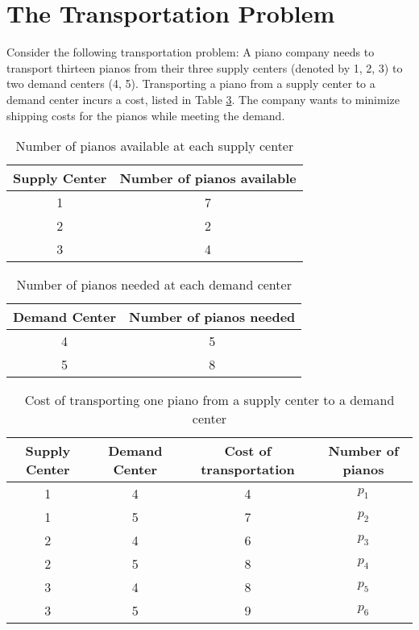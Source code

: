 \section*{The Transportation Problem}

Consider the following transportation problem:
A piano company needs to transport thirteen pianos from their three  supply centers (denoted by 1, 2, 3) to two demand centers (4, 5).
Transporting a piano from a supply center to a demand center incurs a cost, listed in Table \ref{tab:cost}.
The company wants to minimize shipping costs for the pianos while meeting the demand.

\begin{table}[H]
\centering
\begin{tabular}{|c|c|}
Supply Center & Number of pianos available\\
\hline
1 & 7\\
2 & 2\\
3 & 4\\
\end{tabular}

\caption{Number of pianos available at each supply center}
\label{tab:supply}
\end{table}

\begin{table}[H]
\centering
\begin{tabular}{|c|c|}
Demand Center & Number of pianos needed\\
\hline
4 & 5\\
5 & 8\\
\end{tabular}

\caption{Number of pianos needed at each demand center}
\label{tab:demand}
\end{table}

\begin{table}[H]
\centering
\begin{tabular}{|c|c|c|c|}
Supply Center & Demand Center & Cost of transportation & Number of pianos\\
\hline
1 & 4 & 4 & $p_1$\\
1 & 5 & 7 & $p_2$\\
2 & 4 & 6 & $p_3$\\
2 & 5 & 8 & $p_4$\\
3 & 4 & 8 & $p_5$\\
3 & 5 & 9 & $p_6$\\
\end{tabular}
\caption{Cost of transporting one piano from a supply center to a demand center}
\label{tab:cost}
\end{table}

